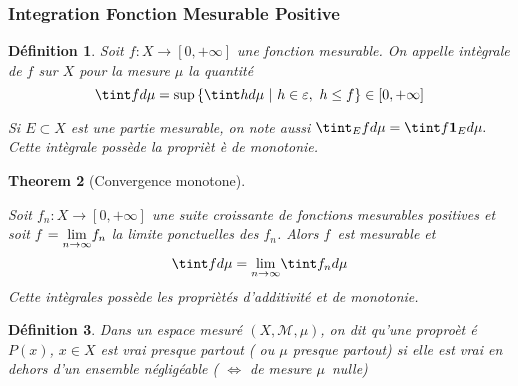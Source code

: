 \documentclass[3pt]{article}
\newtheorem{theorem}{Theorem}
\newtheorem{definition}[theorem]{D\'{e}finition}
\begin{document}
\subsubsection{Integration Fonction Mesurable Positive}

\bigskip

\begin{definition}
Soit $f:X\rightarrow \left[ 0,+\infty \right] $ une fonction mesurable. On
appelle int\`{e}grale de $f$ sur $X$ pour la mesure $\mu $ la quantit\'{e}%
\begin{equation*}
\tint fd\mu =\sup \left\{ \tint hd\mu \text{ }|\text{ }h\in \varepsilon ,%
\text{ }h\leq f\right\} \in \left[ 0,+\infty \right]
\end{equation*}

Si $E\subset X$ est une partie mesurable, on note aussi $\tint_{E}fd\mu
=\tint f\mathbf{1}_{E}d\mu .$ Cette int\`{e}grale poss\`{e}de la propri\`{e}t%
\`{e} de monotonie.
\end{definition}

\bigskip

\begin{theorem}[Convergence monotone]
~\newline

Soit $f_{n}:X\rightarrow \left[ 0,+\infty \right] $ une suite croissante de
fonctions mesurables positives et soit $f$ $=\underset{n\rightarrow \infty }{%
\lim }f_{n}$ la limite ponctuelles des $f_{n}$. Alors $f$\ est mesurable et 
\begin{equation*}
\tint fd\mu =\underset{n\rightarrow \infty }{\lim }\tint f_{n}d\mu
\end{equation*}%
Cette int\`{e}grales poss\`{e}de les propri\`{e}t\'{e}s d'additivit\'{e} et
de monotonie.
\end{theorem}

\bigskip

\begin{definition}
Dans un espace mesur\'{e} $(X,\mathcal{M},\mu )$, on dit qu'une propro\`{e}t%
\'{e} $P(x)$, $x\in X$ est vrai presque partout ( ou $\mu $ presque partout)
si elle est vrai en dehors d'un ensemble n\'{e}glig\'{e}able ( $%
\Longleftrightarrow $ de mesure $\mu $\ nulle)
\end{definition}

\bigskip
\end{document}
